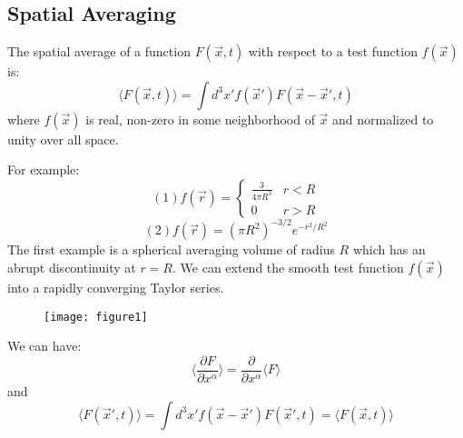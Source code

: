 \documentclass{article}
\begin{document}
	\subsection{Spatial Averaging}
	The spatial average of a function \(F(\vec{x}, t)\) with respect to a test function \(f(\vec{x})\) is:
	\begin{equation}
		\langle F(\vec{x}, t) \rangle = \int d^3x' f(\vec{x}') F(\vec{x} - \vec{x}', t)
	\end{equation}
	where \(f(\vec{x})\) is real, non-zero in some neighborhood of \(\vec{x}\) and normalized to unity over all space.
	
	For example:
	\begin{equation}
		(1) f(\vec{r}) = 
		\begin{cases} 
			\frac{3}{4\pi R^3} & r < R \\
			0 & r > R 
		\end{cases}
	\end{equation}
	\begin{equation}
		(2) f(\vec{r}) = (\pi R^2)^{-3/2} e^{-r^2/R^2}
	\end{equation}
	The first example is a spherical averaging volume of radius $R$ which has an abrupt discontinuity at $r=R$. We can extend the smooth test function $f(\vec{x})$ into a rapidly converging Taylor series.
	
    \begin{figure}[h]
    	\centering
    	\texttt{[image: figure1]}
    	\caption{}
    	\label{fig:figure1}
    \end{figure}
	
	We can have:
	\begin{equation}
		\langle \frac{\partial F}{\partial x^\alpha} \rangle = \frac{\partial}{\partial x^\alpha} \langle F \rangle
	\end{equation}
	and
	\begin{equation}
		\langle F(\vec{x}',t) \rangle = \int d^3x' f(\vec{x}-\vec{x}') F(\vec{x}',t) = \langle F(\vec{x},t) \rangle
	\end{equation}
	
\end{document}
